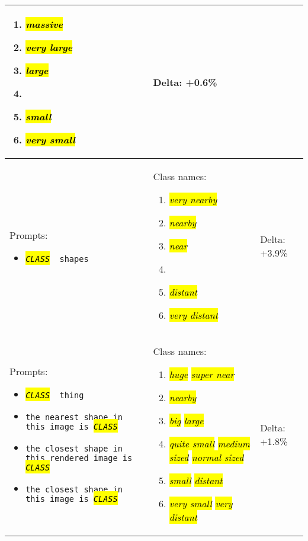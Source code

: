 \documentclass[10pt,twocolumn,letterpaper]{article}
\DeclareRobustCommand{\hlgrey}[1]{{\sethlcolor{light_gray}\hl{#1}}}
\newcommand{\clsfmt}[1]{\hlgrey{\textit{#1}}}
\def \cls {\clsfmt{CLASS}}
\begin{document}
\begin{longtable}[h]{p{}p{}p{}}
\small
\begin{enumerate}[itemsep=1pt,topsep=1pt,leftmargin=12pt]
	\item \clsfmt{massive}
	\item \clsfmt{very large}
	\item \clsfmt{large}
	\item \clsfmt{}
	\item \clsfmt{small}
	\item \clsfmt{very small}
\end{enumerate}
\normalsize
&
Delta: \small 
+0.6\%
\normalsize \\

\midrule


Prompts:
\small
\begin{itemize}[itemsep=1pt,topsep=1pt,leftmargin=12pt]
	\item \texttt{\cls~ shapes}
\end{itemize}
\normalsize &
Class names:

\small
\begin{enumerate}[itemsep=1pt,topsep=1pt,leftmargin=12pt]
	\item \clsfmt{very nearby}
	\item \clsfmt{nearby}
	\item \clsfmt{near}
	\item \clsfmt{}
	\item \clsfmt{distant}
	\item \clsfmt{very distant}
\end{enumerate}
\normalsize
&
Delta: \small 
+3.9\%
\normalsize \\

\midrule


Prompts:
\small
\begin{itemize}[itemsep=1pt,topsep=1pt,leftmargin=12pt]
	\item \texttt{\cls~ thing}
	\item \texttt{the nearest shape in this image is \cls~}
	\item \texttt{the closest shape in this rendered image is \cls~}
	\item \texttt{the closest shape in this image is \cls~}
\end{itemize}
\normalsize &
Class names:

\small
\begin{enumerate}[itemsep=1pt,topsep=1pt,leftmargin=12pt]
	\item \clsfmt{ huge}  \clsfmt{  super near }
	\item \clsfmt{ nearby }
	\item \clsfmt{ big}  \clsfmt{  large }
	\item \clsfmt{ quite small}  \clsfmt{  medium sized}  \clsfmt{  normal sized }
	\item \clsfmt{ small}  \clsfmt{  distant }
	\item \clsfmt{ very small}  \clsfmt{  very distant }
\end{enumerate}
\normalsize
&
Delta: \small 
+1.8\%
\normalsize \\


\end{longtable}
\end{document}
